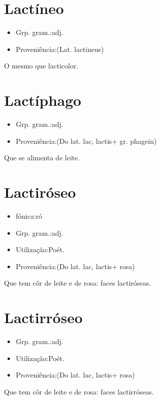 \section{Lactíneo}
\begin{itemize}
\item {Grp. gram.:adj.}
\end{itemize}
\begin{itemize}
\item {Proveniência:(Lat. \textunderscore lactineus\textunderscore )}
\end{itemize}
O mesmo que \textunderscore lacticolor\textunderscore .
\section{Lactíphago}
\begin{itemize}
\item {Grp. gram.:adj.}
\end{itemize}
\begin{itemize}
\item {Proveniência:(Do lat. \textunderscore lac\textunderscore , \textunderscore lactis\textunderscore  + gr. \textunderscore phagein\textunderscore )}
\end{itemize}
Que se alimenta de leite.
\section{Lactiróseo}
\begin{itemize}
\item {fónica:ró}
\end{itemize}
\begin{itemize}
\item {Grp. gram.:adj.}
\end{itemize}
\begin{itemize}
\item {Utilização:Poét.}
\end{itemize}
\begin{itemize}
\item {Proveniência:(Do lat. \textunderscore lac\textunderscore , \textunderscore lactis\textunderscore  + \textunderscore rosa\textunderscore )}
\end{itemize}
Que tem côr de leite e de rosa: \textunderscore faces lactiróseas\textunderscore .
\section{Lactirróseo}
\begin{itemize}
\item {Grp. gram.:adj.}
\end{itemize}
\begin{itemize}
\item {Utilização:Poét.}
\end{itemize}
\begin{itemize}
\item {Proveniência:(Do lat. \textunderscore lac\textunderscore , \textunderscore lactis\textunderscore  + \textunderscore rosa\textunderscore )}
\end{itemize}
Que tem côr de leite e de rosa: \textunderscore faces lactirróseas\textunderscore .
